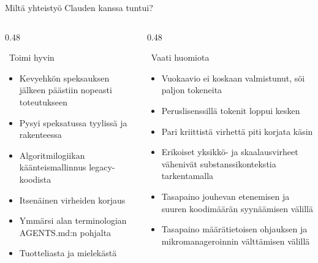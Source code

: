 \documentclass[aspectratio=169]{beamer}
\begin{document}
\begin{frame}{Miltä yhteistyö Clauden kanssa tuntui?}
  \begin{columns}
    \begin{column}{0.48\textwidth}
      \begin{exampleblock}{\faThumbsUp\ Toimi hyvin}
        \begin{itemize}
          \item Kevyehkön speksauksen jälkeen päästiin nopeasti toteutukseen
          \item Pysyi speksatussa tyylissä ja rakenteessa
          \item Algoritmilogiikan käänteismallinnus legacy-koodista
          \item Itsenäinen virheiden korjaus
          \item Ymmärsi alan terminologian AGENTS.md:n pohjalta
          \item Tuotteliasta ja mielekästä
        \end{itemize}
      \end{exampleblock}
    \end{column}
    \begin{column}{0.48\textwidth}
      \begin{alertblock}{\faExclamationTriangle\ Vaati huomiota}
        \begin{itemize}
          \item Vuokaavio ei koskaan valmistunut, söi paljon tokeneita
          \item Peruslisenssillä tokenit loppui kesken
          \item Pari kriittistä virhettä piti korjata käsin
          \item Erikoiset yksikkö- ja skaalausvirheet vähenivät substanssikontekstia tarkentamalla
          \item Tasapaino jouhevan etenemisen ja suuren koodimäärän syynäämisen välillä
          \item Tasapaino määrätietoisen ohjauksen ja mikromanageroinnin välttämisen välillä
        \end{itemize}
      \end{alertblock}
    \end{column}
  \end{columns}
\end{frame}
\end{document}
